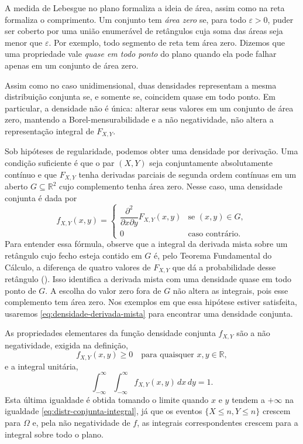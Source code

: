 \documentclass[12pt,portuguese]{article}
\theoremstyle{definition}
\theoremstyle{plainexercise}
\theoremstyle{starredexercise}
\theoremstyle{definition}
\begin{document}
A medida de Lebesgue no plano formaliza a ideia de área, assim como na reta
formaliza o comprimento. Um conjunto tem \emph{área zero} se, para todo
$\varepsilon > 0$, puder ser coberto por uma união enumerável de retângulos
cuja soma das áreas seja menor que $\varepsilon$. Por exemplo, todo segmento
de reta tem área zero. Dizemos que uma propriedade vale
\emph{quase em todo ponto} do plano quando ela pode falhar apenas em um
conjunto de área zero.

Assim como no caso unidimensional, duas densidades representam a mesma
distribuição conjunta se, e somente se, coincidem quase em todo ponto.
Em particular, a densidade não é única: alterar seus valores em um conjunto
de área zero, mantendo a Borel-mensurabilidade e a não negatividade, não altera
a representação integral de $F_{X,Y}$.

Sob hipóteses de regularidade, podemos obter uma densidade por derivação.
Uma condição suficiente é que o par $(X, Y)$ seja conjuntamente absolutamente
contínuo e que $F_{X,Y}$ tenha derivadas parciais de segunda ordem contínuas
em um aberto $G \subseteq \mathbb{R}^2$ cujo complemento tenha área zero.
Nesse caso, uma densidade conjunta é dada por
\begin{equation}\label{eq:densidade-derivada-mista}
  f_{X,Y}(x, y) =
  \begin{cases}
    \dfrac{\partial^2}{\partial x \partial y} F_{X,Y}(x, y)
    & \text{se } (x, y) \in G,
    \\[0.3cm]
    0 & \text{caso contrário}.
  \end{cases}
\end{equation}
Para entender essa fórmula, observe que a integral da derivada mista sobre
um retângulo cujo fecho esteja contido em $G$ é, pelo Teorema Fundamental
do Cálculo, a diferença de quatro valores de $F_{X,Y}$ que dá a probabilidade
desse retângulo (). Isso identifica a derivada
mista com uma densidade quase em todo ponto de $G$. A escolha do valor zero
fora de $G$ não altera as integrais, pois esse complemento tem área zero.
Nos exemplos em que essa hipótese estiver satisfeita, usaremos
\eqref{eq:densidade-derivada-mista} para encontrar uma densidade conjunta.

As propriedades elementares da função densidade conjunta $f_{X,Y}$ são a
não negatividade, exigida na definição,
\begin{equation}\label{eq:densidade-nao-negativa}
  f_{X,Y}(x, y) \geqslant 0 \quad \text{para quaisquer } x, y \in \mathbb{R},
\end{equation}
e a integral unitária,
\begin{equation}\label{eq:densidade-integral-unitaria}
  \int_{-\infty}^{\infty} \int_{-\infty}^{\infty} f_{X,Y}(x, y)\,dx\,dy = 1.
\end{equation}
Esta última igualdade é obtida tomando o limite quando $x$ e $y$ tendem a $+\infty$ na igualdade
\eqref{eq:distr-conjunta-integral}, já que os eventos
$\{X \leqslant n, Y \leqslant n\}$ crescem para $\Omega$ e, pela não
negatividade de $f$, as integrais correspondentes crescem para a integral sobre
todo o plano.
\end{document}
